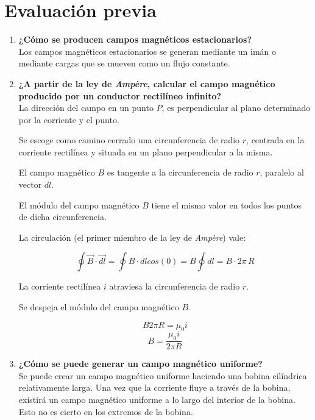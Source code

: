 \documentclass[letter,11pt]{article}
\begin{document}
\section{Evaluación previa}
\begin{enumerate}
\item \textbf{¿Cómo se producen campos magnéticos estacionarios?} \\
Los campos magnéticos estacionarios se generan mediante un imán o mediante
cargas que se mueven como un flujo constante.

\item \textbf{¿A partir de la ley de \emph{Ampère}, calcular el campo magnético
producido por un conductor rectilíneo infinito?} \\
La dirección del campo en un punto $P$, es perpendicular al plano determinado
por la corriente y el punto.

Se escoge como camino cerrado una circunferencia de radio $r$, centrada en la
corriente rectilínea y situada en un plano perpendicular a la misma.

El campo magnético $B$ es tangente a la circunferencia de radio $r$, paralelo al
vector $dl$.

El módulo del campo magnético $B$ tiene el mismo valor en todos los puntos de
dicha circunferencia.

La circulación (el primer miembro de la ley de \emph{Ampère}) vale:

\begin{equation*}
\oint \vec{B}\cdot\vec{dl}=\oint B\cdot dl cos (0) = B \oint dl = B\cdot2\pi\,R
\end{equation*}

La corriente rectilínea $i$ atraviesa la circunferencia de radio $r$.

Se despeja el módulo del campo magnético $B$.

\begin{equation*}
    B 2\pi R = \mu_0 i
\end{equation*}
\begin{equation*}
    B = \frac{\mu_0 i}{2\pi R}
\end{equation*}

\item \textbf{¿Cómo se puede generar un campo magnético uniforme?} \\
Se puede crear un campo magnético uniforme haciendo una bobina cilíndrica
relativamente larga. Una vez que la corriente fluye a través de la bobina,
existirá un campo magnético uniforme a lo largo del interior de la bobina. Esto
no es cierto en los extremos de la bobina.


\end{enumerate}
\end{document}
